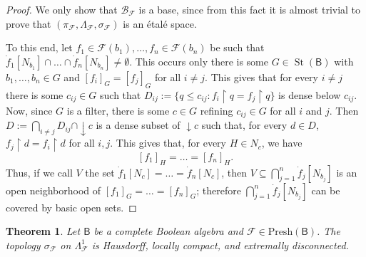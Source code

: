 \documentclass[11pt]{amsart}
\newcommand{\F}{\mathcal{F}}
\newcommand{\Presh}{\textrm{Presh}}
\theoremstyle{plain}
\newtheorem{theorem}{Theorem}[section]
\theoremstyle{definition}
\theoremstyle{plain}
\theoremstyle{remark}
\DeclareMathOperator{\St}{St}
\newcommand{\bool}[1]{\mathsf{#1}}
\newcommand{\0}{\mathsf{0}}
\renewcommand{\1}{\mathsf{1}}
\renewcommand{\2}{\mathsf{2}}
\theoremstyle{definition}
\begin{document}
\begin{proof}
We only show that $\mathcal{B}_\F$ is a base, since from this fact it is almost trivial to prove that $(\pi_\F,\Lambda_\F,\sigma_\F)$ is an \'etal\'e space.

To this end, let $f_1\in\F(b_1),\dots, f_n\in\F(b_n)$ be such that 
$\dot{f}_1[N_{b_1}]\cap\dots\cap\dot{f}_n[N_{b_n}]\neq\emptyset$.
This occurs only there is some
$G\in\St(\bool{B})$ with $b_1,\dots,b_n\in G$ and $[f_i]_{G}=[f_j]_{G}$ for all $i\neq j$. 
This gives that for every $i\neq j$ there is some $c_{ij}\in G$ such that
$D_{ij}:=\{q\leq c_{ij}: f_i\restriction q=f_j\restriction q\}$ is dense below $c_{ij}$.
Now, since $G$ is a filter, there is some $c\in G$ refining $c_{ij}\in G$ for all $i$ and $j$. Then $D:=\bigcap_{i\neq j}D_{ij}\cap\downarrow c$ is a dense subset of $\downarrow c$ such that, for every $d\in D$, $f_j\restriction d=f_i\restriction d$ for all $i,j$.
This gives that, for every $H\in N_c$, we have
\[
[f_1]_{H}=\dots=[f_n]_{H}.
\]
Thus, if we call $V$ the set $\dot{f}_1[N_c]=\dots=\dot{f}_n[N_c]$, then $V\subseteq\bigcap_{j=1}^n\dot{f}_j[N_ {b_j}]$
is an open neighborhood of $[f_1]_{G}=\dots=[f_n]_{G}$; therefore $\bigcap_{j=1}^n\dot{f}_j[N_ {b_j}]$ can be covered by basic open sets.
\end{proof}


\begin{theorem}
\label{fact:lambdahaus} \label{prop:lambdahaus}
Let $\bool{B}$ be a complete Boolean algebra and $\F\in\Presh(\bool{B})$.
The topology $\sigma_\F$ on $\Lambda^1_\F$ is Hausdorff,  locally compact, and extremally disconnected.
 \end{theorem}
\end{document}
